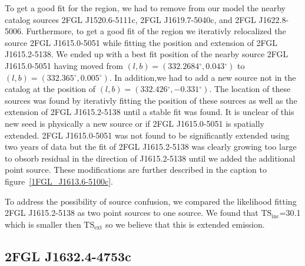 \documentclass[12pt,preprint]{aastex}
\newcommand{\tsext}{{\ensuremath{\text{TS}_\text{ext}}}\xspace}
\newcommand{\tsinc}{\ensuremath{\text{TS}_\text{inc}}\xspace}
\renewcommand{\deg}{\ensuremath{^\circ}\xspace}
\begin{document}
To get a good fit for the region, we had to remove from our model
the nearby catalog sources 2FGL J1520.6-5111c, 2FGL J1619.7-5040c,
and 2FGL J1622.8-5006. Furthermore, to get a good fit of the region we
iterativly relocalized the source 2FGL J1615.0-5051 while fitting the
position and extension of 2FGL J1615.2-5138.  We ended up with a best
fit position of the nearby source 2FGL J1615.0-5051 having moved from
$(l,b)=(332.2684\deg,0.043\deg)$ to $(l,b)=(332.365\deg,0.005\deg)$.  In addition,we
had to add a new source not in the catalog at the position of
$(l,b)=(332.426\deg,-0.331\deg)$.  The location of these sources was found by iterativly
fitting the position of these sources as well as the extension of 2FGL
J1615.2-5138 until a stable fit was found.  It is unclear of this new seed
is physically a new source or if 2FGL J1615.0-5051 is spatially extended.
2FGL J1615.0-5051 was not found to be significantly extended using two
years of data but the fit of 2FGL J1615.2-5138 was clearly growing too
large to obsorb residual in the direction of J1615.2-5138 until we added
the additional point source.
These modifications are further described in the caption to 
figure~\ref{1FGL_J1613.6-5100c}.


To address the possibility of source confusion, we compared the likelihood
fitting 2FGL J1615.2-5138 as two point sources to one source.  We found
that \tsinc=30.1 which is smaller then \tsext so we believe that this
is extended emission.




\subsection{2FGL J1632.4-4753c}


\end{document}
